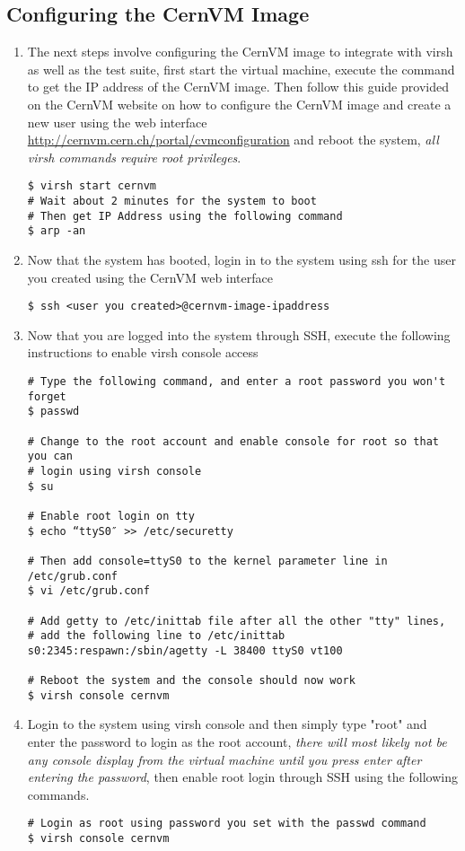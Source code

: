 \subsection{Configuring the CernVM Image}
\begin{enumerate}
\item The next steps involve configuring the CernVM image to integrate with virsh as well as the test suite, first
start the virtual machine, execute the command to get the IP address of the CernVM image. Then follow this guide
provided on the CernVM website on how to configure the CernVM image and create a new user using the web interface \url{http://cernvm.cern.ch/portal/cvmconfiguration} and reboot the system, \emph{all virsh commands require root privileges}.
\begin{lstlisting}
$ virsh start cernvm
# Wait about 2 minutes for the system to boot 
# Then get IP Address using the following command
$ arp -an
\end{lstlisting}

\item Now that the system has booted, login in to the system using ssh for the user you created using the CernVM web interface
\begin{lstlisting}
$ ssh <user you created>@cernvm-image-ipaddress
\end{lstlisting}

\item Now that you are logged into the system through SSH, execute the following instructions to enable virsh console access
\lstset{caption= Enable Virsh Console Access}
\begin{lstlisting}
# Type the following command, and enter a root password you won't forget
$ passwd

# Change to the root account and enable console for root so that you can 
# login using virsh console
$ su

# Enable root login on tty
$ echo “ttyS0″ >> /etc/securetty

# Then add console=ttyS0 to the kernel parameter line in /etc/grub.conf
$ vi /etc/grub.conf

# Add getty to /etc/inittab file after all the other "tty" lines, 
# add the following line to /etc/inittab
s0:2345:respawn:/sbin/agetty -L 38400 ttyS0 vt100

# Reboot the system and the console should now work
$ virsh console cernvm
\end{lstlisting}

\item Login to the system using virsh console and then simply type "root" and enter the password to login as the 
root account, \emph{there will most likely not be any console display from the virtual machine until you press 
enter after entering the password}, then enable root login through SSH using the following commands.
\lstset{caption= Enable SSH Root Login}
\begin{lstlisting}
# Login as root using password you set with the passwd command
$ virsh console cernvm


\end{lstlisting}
\end{enumerate}
